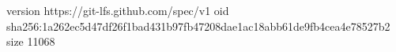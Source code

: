 version https://git-lfs.github.com/spec/v1
oid sha256:1a262ec5d47df26f1bad431b97fb47208dae1ac18abb61de9fb4cea4e78527b2
size 11068
